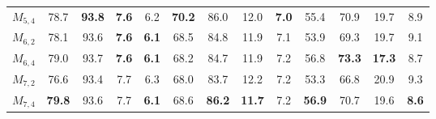 \begin{table}[t]
{\begin{adjustbox}{width=1.3\textwidth,center}
\begin{tabular}{|c|cccc|cccc|cccc|}
                $M_{5,4}$                        & 78.7                         & \textbf{93.8}                         & \textbf{7.6 }         & 6.2           & \textbf{70.2}                        & 86.0                         & 12.0          & \textbf{7.0 }         & 55.4                        & 70.9                        & 19.7          & 8.9           \\
                $M_{6,2}$                        & 78.1                         & 93.6                       & \textbf{7.6}           & \textbf{6.1}           & 68.5                         & 84.8                         & 11.9          & 7.1           & 53.9                         & 69.3                         & 19.7          & 9.1           \\
                $M_{6,4}$                        & 79.0                         & 93.7                         & \textbf{7.6}           & \textbf{6.1}           & 68.2                         & 84.7                         & 11.9          & 7.2           & 56.8                        & \textbf{73.3}                         & \textbf{17.3}          & 8.7           \\
                $M_{7,2}$                        & 76.6                         & 93.4                         & 7.7           & 6.3           & 68.0                         & 83.7                        & 12.2          & 7.2           & 53.3                         & 66.8                         & 20.9          & 9.3           \\
                $M_{7,4}$                        & \textbf{79.8}                         & 93.6                         & 7.7           & \textbf{6.1}           & 68.6                         &\textbf{86.2}                         & \textbf{11.7}          & 7.2           & \textbf{56.9}                         & 70.7                         & 19.6          & \textbf{8.6}           \\ \hline
            \end{tabular}
        \end{adjustbox}
    }
    

\end{table}
